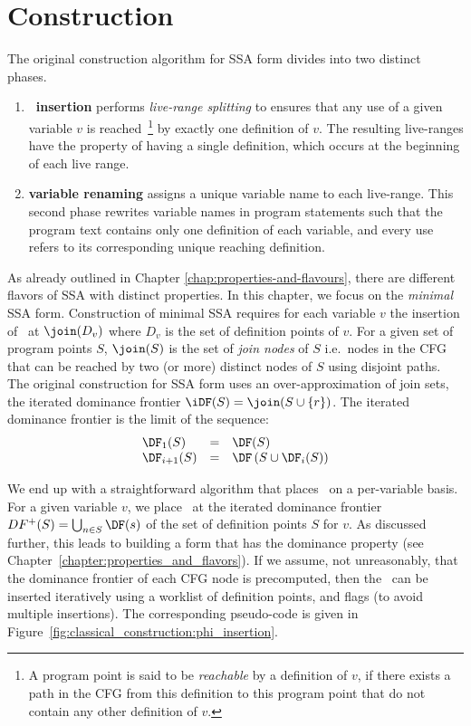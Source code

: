 \section{Construction}
The original construction algorithm for SSA form 
divides into two distinct phases.
\begin{enumerate}
\item \textbf{\phiop\ insertion} performs \textit{live-range splitting} to ensures that any use of a given variable $v$ is reached~\footnote{A program point is said to be \emph{reachable} by a definition of $v$, if there exists a path in the CFG from this definition to this program point that do not contain any other definition of $v$.}  by exactly one definition of $v$. 
The resulting live-ranges have the property of having a single definition, which occurs at the beginning of each live range.
\item \textbf{variable renaming} assigns a unique variable name to each live-range. This second phase rewrites variable names in program statements such that the program text contains only one definition of each variable, and every use refers to its corresponding unique reaching definition.
\end{enumerate}

As already outlined in Chapter \ref{chap:properties-and-flavours},
there are different flavors of SSA with distinct properties.
In this chapter, we focus on the \textit{minimal} SSA form.
Construction of minimal SSA 
requires for each variable $v$ the insertion of \phiops\ at $\join(D_v)$ where $D_v$ is the set of definition points of $v$.  For a given set of program points $S$, $\join(S)$ is the set of \textit{join nodes} of $S$
i.e.\ nodes in the CFG that can be reached by two (or more) distinct nodes of $S$ using disjoint paths. 
The original construction for SSA form uses an over-approximation of join sets, the iterated dominance frontier $\iDF(S)=\join(S\cup \{r\})$. 
The iterated dominance frontier is the limit of the sequence:
$$\begin{array}{lll}
\DF_1(S) & = & \DF(S)\\
\DF_{i+1}(S) & = & \DF\left(S\cup \DF_i(S)\right)
\end{array}$$

We end up with a straightforward algorithm that places \phiops\ on a per-variable basis.
For a given variable $v$, we place \phiops\ at the iterated dominance frontier $DF^{+}(S)=\bigcup_{n\in S} \DF(s)$ of the set of definition points $S$ for $v$. As discussed further, this leads to building a form that has the dominance property (see Chapter~\ref{chapter:properties_and_flavors}).
If we assume, not unreasonably, that the dominance frontier of each CFG node is precomputed, then the \phiops\ can be inserted iteratively using a worklist of definition points, and flags (to avoid multiple insertions). The corresponding pseudo-code is given in Figure~\ref{fig:classical_construction:phi_insertion}.

